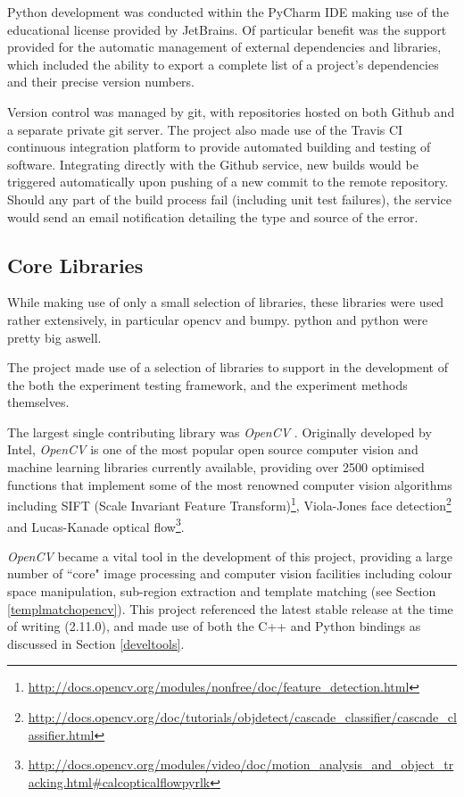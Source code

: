 Python development was conducted within the PyCharm IDE making use of the educational license provided by JetBrains. Of particular benefit was the support provided for the automatic management of external dependencies and libraries, which included the ability to export a complete list of a project's dependencies and their precise version numbers.

Version control was managed by git, with repositories hosted on both Github and a separate private git server. The project also made use of the Travis CI continuous integration platform to provide automated building and testing of software. Integrating directly with the Github service, new builds would be triggered automatically upon pushing of a new commit to the remote repository. Should any part of the build process fail (including unit test failures), the service would send an email notification detailing the type and source of the error.  

\subsection{Core Libraries}
\label{libs}

While making use of only a small selection of libraries, these libraries were used rather extensively, in particular opencv and bumpy. python and python were pretty big aswell.

The project made use of a selection of libraries to support in the development of the both the experiment testing framework, and the experiment methods themselves.

The largest single contributing library was \textit{OpenCV} \cite{opencv}. Originally developed by Intel, \textit{OpenCV} is one of the most popular open source computer vision and machine learning libraries currently available, providing over 2500 optimised functions that implement some of the most renowned computer vision algorithms including SIFT (Scale Invariant Feature Transform)\footnote{\url{http://docs.opencv.org/modules/nonfree/doc/feature_detection.html}}, Viola-Jones face detection\footnote{\url{http://docs.opencv.org/doc/tutorials/objdetect/cascade_classifier/cascade_classifier.html}} and Lucas-Kanade optical flow\footnote{\url{http://docs.opencv.org/modules/video/doc/motion_analysis_and_object_tracking.html#calcopticalflowpyrlk}}. 

\textit{OpenCV} became a vital tool in the development of this project, providing a large number of ``core" image processing and computer vision facilities including colour space manipulation, sub-region extraction and template matching (see Section \ref{templmatchopencv}). This project referenced the latest stable release at the time of writing (2.11.0), and made use of both the C++ and Python bindings as discussed in Section \ref{develtools}.

